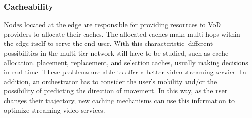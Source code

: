 \subsubsection{Cacheability}


Nodes located at the edge are responsible for providing resources to VoD providers to allocate their caches.  
The allocated caches make multi-hops within the edge itself to serve the end-user. 
With this characteristic, different possibilities in the multi-tier network still have to be studied, such as cache allocation, placement, replacement, and selection caches, usually making decisions in real-time. These problems are able to offer a better video streaming service.
In addition, an orchestrator has to consider the user's mobility and/or the possibility of predicting the direction of movement. In this way, as the user changes their trajectory, new caching mechanisms can use this information to optimize streaming video services.